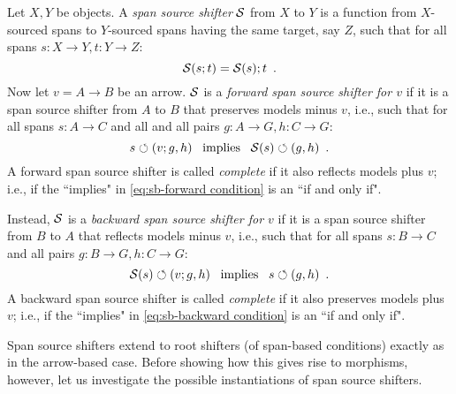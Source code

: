 \begin{definition}
Let $X,Y$ be objects. A \emph{span source shifter} $\mathcal{S}$ from $X$ to $Y$ is a function from $X$-sourced spans to $Y$-sourced spans having the same target, say $Z$, such that for all spans $s:X\to Y,t:Y\to Z$:
%
\begin{equation}\eqlabel{span shifters are functors}
\cS(s;t) = \cS(s);t \enspace.
\end{equation}
%
Now let $v=A\to B$ be an arrow. $\mathcal{S}$ is a \emph{forward span source shifter for $v$} if it is a span source shifter from $A$ to $B$ that preserves models minus $v$, i.e., such that for all spans $s:A\to C$ and all and all pairs $g:A\to G,h:C \to G$:
%
\begin{equation}\eqlabel{sb-forward condition}
s\commutes (v;g,h) \enspace\text{ implies }\enspace \cS(s) \commutes (g,h) \enspace.
\end{equation}
%
A forward span source shifter is called \emph{complete} if it also reflects models plus $v$; i.e., if the ``implies" in \eqref{eq:sb-forward condition} is an ``if and only if".

Instead, $\mathcal{S}$ is a \emph{backward span source shifter for $v$} if it is a span source shifter from $B$ to $A$ that reflects models minus $v$, i.e., such that for all spans $s:B\to C$ and all pairs $g:B\to G,h:C\to G$:
%
\begin{equation}\eqlabel{sb-backward condition}
\cS(s) \commutes (v;g,h) \enspace\text{ implies }\enspace s\commutes (g,h) \enspace.
\end{equation}
%
A backward span source shifter is called \emph{complete} if it also preserves models plus $v$; i.e., if the ``implies" in \eqref{eq:sb-backward condition} is an ``if and only if".
\end{definition}
%
Span source shifters extend to root shifters (of span-based conditions) exactly as in the arrow-based case. Before showing how this gives rise to morphisms, however, let us investigate the possible instantiations of span source shifters.

